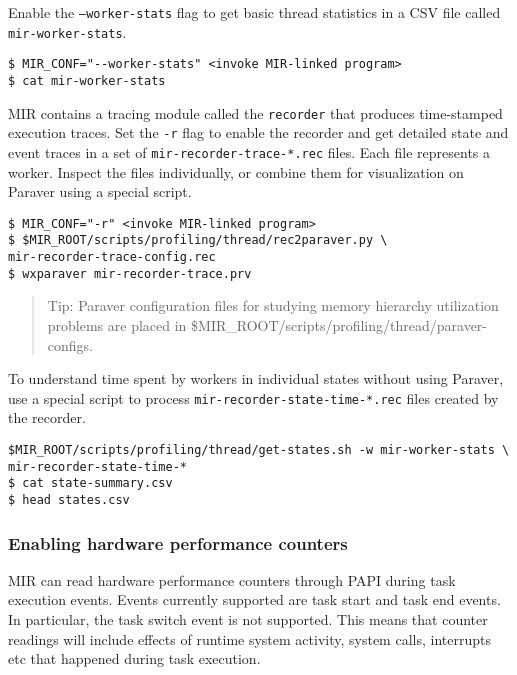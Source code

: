 \documentclass[11pt,a4paper]{article}
\begin{document}
Enable the \texttt{--worker-stats} flag to get basic thread statistics in a CSV file called \texttt{mir-worker-stats}.

\begin{lstlisting}[style=MyInputStyle]
$ MIR_CONF="--worker-stats" <invoke MIR-linked program>
$ cat mir-worker-stats
\end{lstlisting}

MIR contains a tracing module called the \texttt{recorder} that produces time-stamped execution traces. Set the \texttt{-r} flag to enable the recorder and get detailed state and event traces in a set of \texttt{mir-recorder-trace-*.rec} files.  Each file represents a worker. Inspect the files individually, or combine them for visualization on Paraver using a special script.

\begin{lstlisting}[style=MyInputStyle]
$ MIR_CONF="-r" <invoke MIR-linked program>
$ $MIR_ROOT/scripts/profiling/thread/rec2paraver.py \
mir-recorder-trace-config.rec
$ wxparaver mir-recorder-trace.prv
\end{lstlisting}

\begin{framed}
\begin{quote}
Tip: Paraver configuration files for studying memory hierarchy utilization problems are placed in \$MIR\_ROOT/scripts/profiling/thread/paraver-configs.
\end{quote}
\end{framed}

To understand time spent by workers in individual states without using Paraver, use a special script to process \texttt{mir-recorder-state-time-*.rec} files created by the recorder.

\begin{lstlisting}[style=MyInputStyle]
$MIR_ROOT/scripts/profiling/thread/get-states.sh -w mir-worker-stats \
mir-recorder-state-time-*
$ cat state-summary.csv
$ head states.csv
\end{lstlisting}

\subsubsection{Enabling hardware performance counters}\label{enabling-hardware-performance-counters}

MIR can read hardware performance counters through PAPI during task execution events. Events currently supported are task start and task end events.
In particular, the task switch event is not supported.
This means that counter readings will include effects of runtime system activity, system calls, interrupts etc that happened during task execution.
\end{document}
